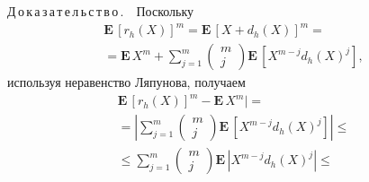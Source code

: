 \begin{multicols}{2}
\noindent
Д\,о\,к\,а\,з\,а\,т\,е\,л\,ь\,с\,т\,в\,о\,.\ \ Поскольку
\begin{multline*}
\mathbf{E}\,\left[r_h(X)\right]^m=\mathbf{E}\,\left[X+d_h(X)\right]^m={}\\
{}=\mathbf{E}\,X^m+\sum\limits_{j=1}^m
\begin{pmatrix}
m\\j
\end{pmatrix}
\mathbf{E}\,\left[X^{m-j}d_h(X)^j\right],
\end{multline*}
используя неравенство Ляпунова, получаем
\begin{multline*}
\mathbf{E}\,\left[r_h(X)\right]^m-\mathbf{E}\, X^m|={}\\
{}=\left|\sum\limits_{j=1}^m \begin{pmatrix}
m\\ j
\end{pmatrix}
\mathbf{E}\,\left[X^{m-j}d_h(X)^j\right]\right|\leqslant{}\\
{}\leqslant
\sum\limits_{j=1}^m
\begin{pmatrix}
m\\ j
\end{pmatrix}
\mathbf{E}\,|X^{m-j}d_h(X)^j|\leqslant{}
\end{multline*}

\end{multicols}

